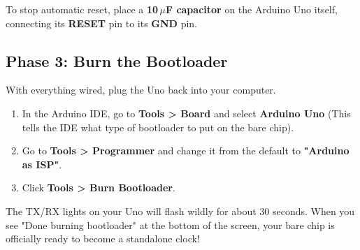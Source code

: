 \documentclass[11pt,a4paper]{article}
\begin{document}
 To stop automatic reset, place a \textbf{10\,$\mu$F capacitor} on the Arduino Uno itself, connecting its \textbf{RESET} pin to its \textbf{GND} pin. 

\subsection*{Phase 3: Burn the Bootloader}
With everything wired, plug the Uno back into your computer. 
\begin{enumerate}
    \item In the Arduino IDE, go to \textbf{Tools > Board} and select \textbf{Arduino Uno} (This tells the IDE what type of bootloader to put on the bare chip).
    \item Go to \textbf{Tools > Programmer} and change it from the default to \textbf{"Arduino as ISP"}.
    \item Click \textbf{Tools > Burn Bootloader}. 
\end{enumerate}
The TX/RX lights on your Uno will flash wildly for about 30 seconds. When you see "Done burning bootloader" at the bottom of the screen, your bare chip is officially ready to become a standalone clock!
\newpage
\end{document}
